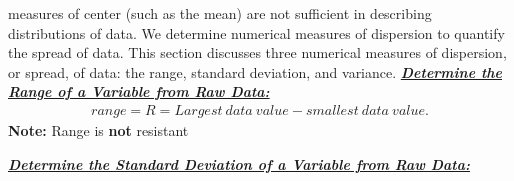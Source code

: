 \documentclass{report}
\begin{document}
        \bigbreak \noindent 
        measures of center (such as the mean) are not sufficient in describing distributions of data. We determine numerical measures of dispersion to quantify the spread of data. This section discusses three numerical measures of dispersion, or spread, of data: the range, standard deviation, and variance.
        \bigbreak \noindent \bigbreak \noindent 
        \textbf{\textit{\underline{Determine the Range of a Variable from Raw Data:}}}
        \begin{align*}
            range = R = Largest\ data\ value- smallest\ data\ value
        .\end{align*}
        \bigbreak \noindent 
        \textbf{Note:} Range is \textbf{not} resistant

        \bigbreak \noindent \bigbreak \noindent
        \textbf{\textit{\underline{Determine the Standard Deviation of a Variable from Raw Data:}}}
        \bigbreak \noindent 
\end{document}
